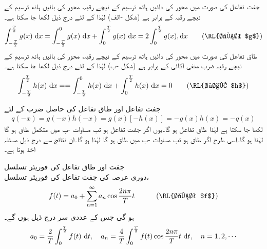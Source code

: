 جفت تفاعل  کی صورت میں  محور کی دائیں ہاتھ ترسیم کے نیچے رقبہ، محور کی بائیں ہاتھ ترسیم کے نیچے رقبہ کے  برابر ہے (شکل -الف) لہٰذا  کے لئے درج ذیل لکھا جا سکتا ہے۔
\begin{align}\label{مساوات_فوریئر_جفت_تفاعل_تکمل}
\int_{-\frac{T}{2}}^{\frac{T}{2}}g(x)\,\dif x=\int_{-\frac{T}{2}}^{0}g(x)\,\dif x+\int_{0}^{\frac{T}{2}}g(x)\,\dif x=2\int_{0}^{\frac{T}{2}}g(x),\dif x\quad \quad (\text{\RL{جفت $g$}})
\end{align}
طاق تفاعل  کی صورت میں  محور کی دائیں ہاتھ ترسیم کے نیچے رقبہ، محور کی بائیں ہاتھ ترسیم کے نیچے رقبہ ضرب منفی اکائی کے برابر ہے (شکل -ب) لہٰذا  کے لئے درج ذیل لکھا جا سکتا ہے۔
\begin{align}\label{مساوات_فوریئر_طاق_تفاعل_تکمل}
\int_{-\frac{T}{2}}^{\frac{T}{2}}h(x)\,\dif x==\int_{-\frac{T}{2}}^{0}h(x)\,\dif x+\int_{0}^{\frac{T}{2}}h(x)\,\dif x=0\quad \quad (\text{\RL{طاق $h$}})
\end{align}

جفت تفاعل  اور طاق تفاعل  کی حاصل ضرب  کے لئے
\begin{align*}
q(-x)=g(-x)h(-x)=g(x)[-h(x)]=-g(x)h(x)=-q(x)
\end{align*}
لکھا جا سکتا ہے لہٰذا   طاق تفاعل ہو گا۔یوں اگر  جفت تفاعل ہو تب مساوات -پ میں متکمل  طاق ہو گا لہٰذا  ہو گا۔اسی طرح اگر  طاق ہو تب مساوات -ب میں  طاق ہو گا لہٰذا  ہو گا۔ان نتائج سے درج ذیل مسئلہ اخذ ہوتا ہے۔

\quad جفت اور طاق تفاعل کی فوریئر تسلسل\\ 
دوری عرصہ  کی جفت تفاعل  کی فوریئر تسلسل، 
\begin{align}\label{مساوات_فوریئر_جفت_فوریئر_تسلسل}
f(t)=a_0+\sum_{n=1}^{\infty} a_n\cos \frac{2n\pi}{T}t\quad \quad \quad (\text{\RL{جفت $f$}})
\end{align}
 ہو گی جس کے عددی سر درج ذیل ہوں گے۔
\begin{align}\label{مساوات_فوریئر_جفت_تسلسل_عددی_سر}
a_0=\frac{2}{T}\int_{0}^{\frac{T}{2}}f(t)\,\dif t, \quad a_n=\frac{4}{T}\int_{0}^{\frac{T}{2}}f(t)\cos \frac{2n\pi}{T}t\,\dif t,\quad n=1,2,\cdots
\end{align}
 
